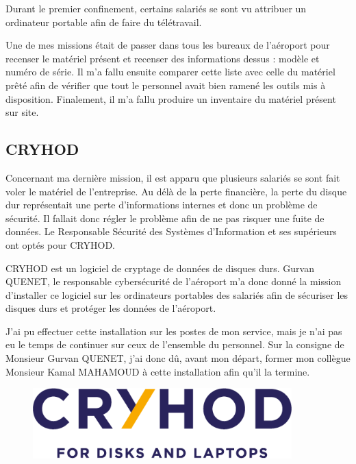 Durant le premier confinement, certains salariés se sont vu attribuer un ordinateur portable afin de faire du télétravail.

Une de mes missions était de passer dans tous les bureaux de l’aéroport pour recenser le matériel présent et recenser des informations dessus : modèle et numéro de série. Il m'a fallu ensuite comparer cette liste avec celle du matériel prêté afin de vérifier que tout le personnel avait bien ramené les outils mis à disposition.
Finalement, il m'a fallu produire un inventaire du matériel présent sur site.\newline

\subsection{CRYHOD}

Concernant ma dernière mission, il est apparu que plusieurs salariés se sont fait voler le matériel de l'entreprise. Au délà de la perte financière, la perte du disque dur représentait une perte d’informations internes et donc un problème de sécurité. Il fallait donc régler le problème afin de ne pas risquer une fuite de données. Le Responsable Sécurité des Systèmes d’Information et ses supérieurs ont optés pour CRYHOD.


CRYHOD est un logiciel de cryptage de données de disques durs. Gurvan QUENET, le responsable cybersécurité de l’aéroport m’a donc donné la mission d’installer ce logiciel sur les ordinateurs portables des salariés afin de sécuriser les disques durs et protéger les données de l’aéroport.

J’ai pu effectuer cette installation sur les postes de mon service, mais je n'ai pas eu le temps de continuer sur ceux de l'ensemble du personnel. Sur la consigne de Monsieur Gurvan QUENET, j'ai donc dû, avant mon départ, former mon collègue Monsieur Kamal MAHAMOUD à cette installation afin qu'il la termine.\newline

\begin{figure}[hbt!]
  \centering
  \includegraphics[width=10cm]{Images/logo_cryhod.png}
  \label{fig:logocryhod}
\end{figure}


